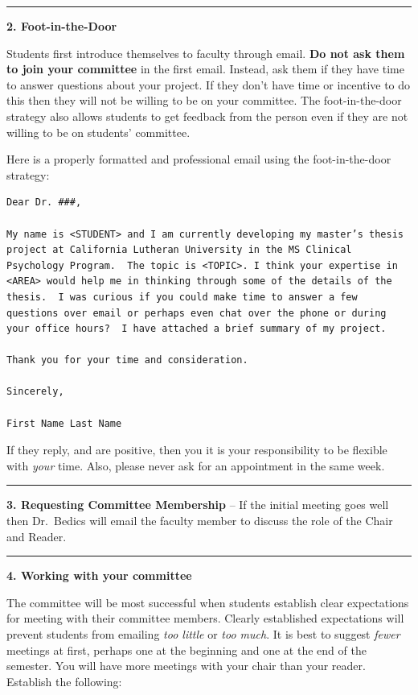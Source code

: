 \documentclass[openany]{book}
\begin{document}
\begin{center}\rule{0.5\linewidth}{0.5pt}\end{center}

\textbf{2. Foot-in-the-Door}

Students first introduce themselves to faculty through email. \textbf{Do not ask them to join your committee} in the first email. Instead, ask them if they have time to answer questions about your project. If they don't have time or incentive to do this then they will not be willing to be on your committee. The foot-in-the-door strategy also allows students to get feedback from the person even if they are not willing to be on students' committee.

Here is a properly formatted and professional email using the foot-in-the-door strategy:

\begin{verbatim}
Dear Dr. ###,

My name is <STUDENT> and I am currently developing my master’s thesis project at California Lutheran University in the MS Clinical Psychology Program.  The topic is <TOPIC>. I think your expertise in <AREA> would help me in thinking through some of the details of the thesis.  I was curious if you could make time to answer a few questions over email or perhaps even chat over the phone or during your office hours?  I have attached a brief summary of my project.

Thank you for your time and consideration.

Sincerely,

First Name Last Name
\end{verbatim}

If they reply, and are positive, then you it is your responsibility to be flexible with \emph{your} time. Also, please never ask for an appointment in the same week.

\begin{center}\rule{0.5\linewidth}{0.5pt}\end{center}

\textbf{3. Requesting Committee Membership} -- If the initial meeting goes well then Dr.~Bedics will email the faculty member to discuss the role of the Chair and Reader.

\begin{center}\rule{0.5\linewidth}{0.5pt}\end{center}

\textbf{4. Working with your committee}

The committee will be most successful when students establish clear expectations for meeting with their committee members. Clearly established expectations will prevent students from emailing \emph{too little} or \emph{too much}. It is best to suggest \emph{fewer} meetings at first, perhaps one at the beginning and one at the end of the semester. You will have more meetings with your chair than your reader. Establish the following:
\end{document}
